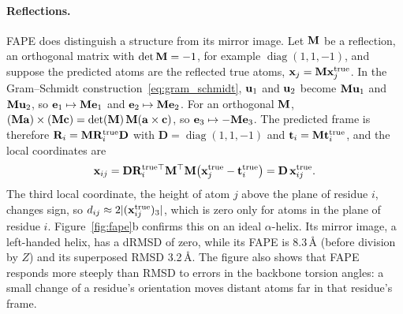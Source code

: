 \paragraph{Reflections.} FAPE does distinguish a structure from its mirror image. Let $\mathbf{M}$ be a reflection, an orthogonal matrix with $\det\mathbf{M}=-1$, for example $\operatorname{diag}(1,1,-1)$, and suppose the predicted atoms are the reflected true atoms, $\mathbf{x}_j=\mathbf{M}\mathbf{x}^{\text{true}}_j$. In the Gram--Schmidt construction~\eqref{eq:gram_schmidt}, $\mathbf{u}_1$ and $\mathbf{u}_2$ become $\mathbf{M}\mathbf{u}_1$ and $\mathbf{M}\mathbf{u}_2$, so $\mathbf{e}_1\mapsto\mathbf{M}\mathbf{e}_1$ and $\mathbf{e}_2\mapsto\mathbf{M}\mathbf{e}_2$. For an orthogonal $\mathbf{M}$, $(\mathbf{M}\mathbf{a})\times(\mathbf{M}\mathbf{c})=\det(\mathbf{M})\,\mathbf{M}(\mathbf{a}\times\mathbf{c})$, so $\mathbf{e}_3\mapsto-\mathbf{M}\mathbf{e}_3$. The predicted frame is therefore $\mathbf{R}_i=\mathbf{M}\mathbf{R}^{\text{true}}_i\mathbf{D}$ with $\mathbf{D}=\operatorname{diag}(1,1,-1)$ and $\mathbf{t}_i=\mathbf{M}\mathbf{t}^{\text{true}}_i$, and the local coordinates are
\begin{equation}
  \mathbf{x}_{ij} = \mathbf{D}\mathbf{R}^{\text{true}\top}_i\mathbf{M}^\top\mathbf{M}\big(\mathbf{x}^{\text{true}}_j-\mathbf{t}^{\text{true}}_i\big) = \mathbf{D}\,\mathbf{x}^{\text{true}}_{ij}.
\end{equation}
The third local coordinate, the height of atom $j$ above the plane of residue $i$, changes sign, so $d_{ij}\approx2|(\mathbf{x}^{\text{true}}_{ij})_3|$, which is zero only for atoms in the plane of residue $i$. Figure~\ref{fig:fape}b confirms this on an ideal $\alpha$-helix. Its mirror image, a left-handed helix, has a dRMSD of zero, while its FAPE is 8.3\,\AA{} (before division by $Z$) and its superposed RMSD 3.2\,\AA. The figure also shows that FAPE responds more steeply than RMSD to errors in the backbone torsion angles: a small change of a residue's orientation moves distant atoms far in that residue's frame.

